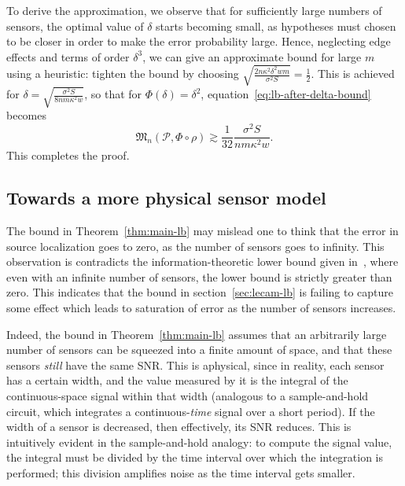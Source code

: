 \documentclass[conference]{IEEEtran}
\newcommand{\Phiorho}{\Phi\!\circ\!\rho}
\begin{document}
\begin{IEEEproof}
To derive the approximation, we observe that for sufficiently large numbers of
sensors, the optimal value of $\delta$ starts becoming small, as hypotheses
must chosen to be closer in order to make the error probability large. Hence,
neglecting edge effects and terms of order $\delta^3$, we can give an
approximate bound for large $m$ using a heuristic: tighten the bound by
choosing $\sqrt{\frac{2n\kappa^2\delta^2wm}{\sigma^2 S}} = \frac{1}{2}$. This
is achieved for $\delta = \sqrt{\frac{\sigma^2 S}{8nm\kappa^2 w}}$, so that for
$\Phi(\delta) = \delta^2$, equation~\eqref{eq:lb-after-delta-bound} becomes
\begin{equation}
	\mathfrak{M}_n(\mathcal{P}, \Phiorho) \gtrsim \frac{1}{32} \frac{\sigma^2 S}{nm\kappa^2 w}.
\end{equation}
This completes the proof.
\end{IEEEproof}

\subsection{Towards a more physical sensor model}

The bound in Theorem~\ref{thm:main-lb} may mislead one to think that the error
in source localization goes to zero, as the number of sensors goes to infinity.
This observation is contradicts the information-theoretic lower bound given
in~\cite{Grover2016Fundamental}, where even with an infinite number of sensors,
the lower bound is strictly greater than zero. This indicates that the bound in
section~\ref{sec:lecam-lb} is failing to capture some effect which leads to
saturation of error as the number of sensors increases.

Indeed, the bound in Theorem~\ref{thm:main-lb} assumes that an arbitrarily
large number of sensors can be squeezed into a finite amount of space, and that
these sensors \emph{still} have the same SNR.  This is aphysical, since in
reality, each sensor has a certain width, and the value measured by it is the
integral of the continuous-space signal within that width (analogous to a
sample-and-hold circuit, which integrates a continuous-\emph{time} signal over
a short period).  If the width of a sensor is decreased, then effectively, its
SNR reduces.  This is intuitively evident in the sample-and-hold analogy: to
compute the signal value, the integral must be divided by the time interval
over which the integration is performed; this division amplifies noise as the
time interval gets smaller.
\end{document}
